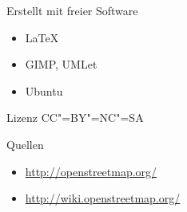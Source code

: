 \documentclass{beamer}
\begin{document}
\begin{frame}
    \begin{block}{Erstellt mit freier Software}
        \begin{itemize}
            \item \LaTeX
            \item GIMP, UMLet
            \item Ubuntu
        \end{itemize}
    \end{block}
    
    \begin{block}{Lizenz}
        CC"=BY"=NC"=SA
    \end{block}
    
    \begin{block}{Quellen}
        \begin{itemize}
            \item \url{http://openstreetmap.org/}
            \item \url{http://wiki.openstreetmap.org/}
        \end{itemize}
    \end{block}
\end{frame}
\end{document}
